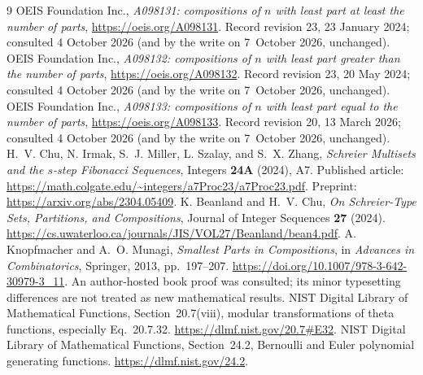 \documentclass[11pt]{article}
\theoremstyle{remark}\newtheorem{remark}[theorem]{Remark}
\begin{document}
\begin{thebibliography}{9}
OEIS Foundation Inc., \emph{A098131: compositions of $n$ with least part at least the number of parts},
\url{https://oeis.org/A098131}. Record revision 23, 23 January 2024; consulted 4 October 2026 (and by the write on 7~October 2026, unchanged).
OEIS Foundation Inc., \emph{A098132: compositions of $n$ with least part greater than the number of parts},
\url{https://oeis.org/A098132}. Record revision 23, 20 May 2024; consulted 4 October 2026 (and by the write on 7~October 2026, unchanged).
OEIS Foundation Inc., \emph{A098133: compositions of $n$ with least part equal to the number of parts},
\url{https://oeis.org/A098133}. Record revision 20, 13 March 2026; consulted 4 October 2026 (and by the write on 7~October 2026, unchanged).
H.~V. Chu, N. Irmak, S.~J. Miller, L. Szalay, and S.~X. Zhang,
\emph{Schreier Multisets and the $s$-step Fibonacci Sequences}, Integers \textbf{24A} (2024), A7.
Published article: \url{https://math.colgate.edu/~integers/a7Proc23/a7Proc23.pdf}.
Preprint: \url{https://arxiv.org/abs/2304.05409}.
K. Beanland and H.~V. Chu, \emph{On Schreier-Type Sets, Partitions, and Compositions}, Journal of Integer Sequences \textbf{27} (2024).
\url{https://cs.uwaterloo.ca/journals/JIS/VOL27/Beanland/bean4.pdf}.
A. Knopfmacher and A.~O. Munagi, \emph{Smallest Parts in Compositions}, in \emph{Advances in Combinatorics}, Springer, 2013, pp.~197--207.
\url{https://doi.org/10.1007/978-3-642-30979-3_11}.
An author-hosted book proof was consulted; its minor typesetting differences are not treated as new mathematical results.
NIST Digital Library of Mathematical Functions, Section~20.7(viii), modular transformations of theta functions, especially Eq.~20.7.32.
\url{https://dlmf.nist.gov/20.7#E32}.
NIST Digital Library of Mathematical Functions, Section~24.2, Bernoulli and Euler polynomial generating functions.
\url{https://dlmf.nist.gov/24.2}.
\end{thebibliography}
\end{document}
